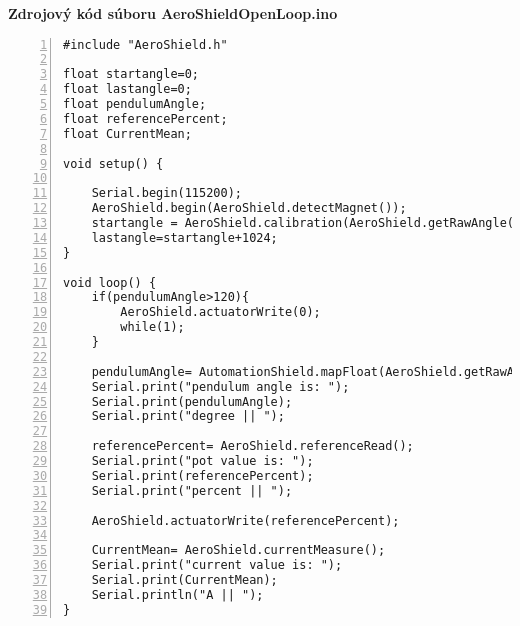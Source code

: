 \LARGE\bf{Zdrojový kód súboru AeroShieldOpenLoop.ino}
\label{AeroShieldOpenLoop.ino}
\vspace{1cm}
\begin{lstlisting}[numbers=left,basicstyle=\scriptsize,caption={Zdrojový kód súboru AeroShieldOpenLoop.ino.},captionpos=b]	
#include "AeroShield.h" 

float startangle=0; 
float lastangle=0; 
float pendulumAngle;  
float referencePercent;  
float CurrentMean; 

void setup() {
	
	Serial.begin(115200);   
	AeroShield.begin(AeroShield.detectMagnet());
	startangle = AeroShield.calibration(AeroShield.getRawAngle());
	lastangle=startangle+1024;  
}

void loop() {
	if(pendulumAngle>120){
		AeroShield.actuatorWrite(0);
		while(1);
	}
	
	pendulumAngle= AutomationShield.mapFloat(AeroShield.getRawAngle(),startangle,lastangle,0.00,90.00);
	Serial.print("pendulum angle is: ");
	Serial.print(pendulumAngle); 
	Serial.print("degree || ");
	
	referencePercent= AeroShield.referenceRead();
	Serial.print("pot value is: ");
	Serial.print(referencePercent);
	Serial.print("percent || ");
	
	AeroShield.actuatorWrite(referencePercent); 
	
	CurrentMean= AeroShield.currentMeasure();
	Serial.print("current value is: ");
	Serial.print(CurrentMean);   
	Serial.println("A || ");
}
\end{lstlisting}